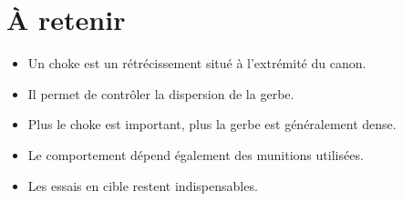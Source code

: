 \section{À retenir}

\begin{aretenir}

\begin{itemize}
    \item Un choke est un rétrécissement situé à l'extrémité du canon.
    \item Il permet de contrôler la dispersion de la gerbe.
    \item Plus le choke est important, plus la gerbe est généralement dense.
    \item Le comportement dépend également des munitions utilisées.
    \item Les essais en cible restent indispensables.
\end{itemize}

\end{aretenir}
